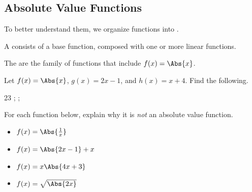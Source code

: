 \subsection{Absolute Value Functions} 
To better understand them, we organize functions into .
\begin{definition}
A  consists of a base function, composed with one or more linear functions.
\end{definition}
\begin{definition}
The  are the family of functions that include $f(x)=\Abs{x}$.
\end{definition}
\begin{Example}Let $f(x)=\Abs{x}$, $g(x)=2x-1$, and $h(x)=x+4$. Find the following.
\begin{lpicvsplit}{2}{3}
;
;
\end{lpicvsplit}
\end{Example}
\begin{Example}
For each function below, explain why it is \emph{not} an absolute value function.
\begin{itemize}
\item $f(x)=\Abs{\frac{1}{x}}$\makeblanknewf
\item $f(x)=\Abs{2x-1}+x$\makeblanknewf
\item $f(x)=x\Abs{4x+3}$\makeblanknewf
\item $f(x)=\sqrt{\Abs{2x}}$\makeblanknewf
\end{itemize}
\end{Example}